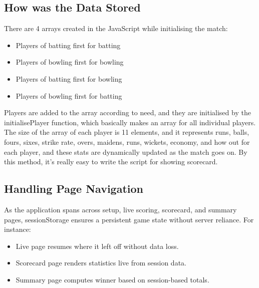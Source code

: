 \documentclass[a4paper,10pt]{article}
\begin{document}
\subsection{How was the Data Stored}
There are 4 arrays created in the JavaScript while initialising the match:
\begin{itemize}
    \item Players of batting first for batting
    \item Players of bowling first for bowling
    \item Players of batting first for bowling
    \item Players of bowling first for batting
    
\end{itemize}
Players are added to the array according to need, and they are initialised by the initialisePlayer function, which basically makes an array for all individual players. The size of the array of each player is 11 elements, and it represents runs, balls, fours, sixes, strike rate, overs, maidens, runs, wickets, economy, and how out for each player, and these stats are dynamically updated as the match goes on. By this method, it's really easy to write the script for showing scorecard.
\subsection{Handling Page Navigation}
As the application spans across setup, live scoring, scorecard, and summary pages, sessionStorage ensures a persistent game state without server reliance. For instance:
\begin{itemize}
    \item Live page resumes where it left off without data loss.
    \item Scorecard page renders statistics live from session data.
    \item Summary page computes winner based on session-based totals.
\end{itemize}
\end{document}
